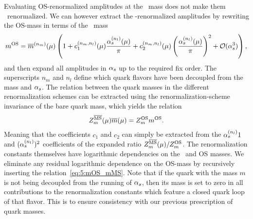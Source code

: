 Evaluating \acs{OS}-renormalized amplitudes at the \MS\ mass does not make them \MS\ renormalized. We can however extract the \MS-renormalized amplitudes by rewriting the \acs{OS}-mass in terms of the \MS\ mass
\begin{equation}
m^{\text{OS}}  = \overline{m}^{(n_m)}(\mu) \left(1 + c_1^{(n_m,n_l)} (\mu) \frac{\alpha_s^{(n_l)}(\mu)}{\pi} + c_2^{(n_m, n_l)}(\mu) \left( \frac{\alpha_s^{(n_l)}(\mu)}{\pi} \right)^2 + \mathcal{O}(\alpha_s^3)\right),
\label{eq:5:mOS_mMS}
\end{equation}
and then expand all amplitudes in $\alpha_s$ up to the required fix order. The superscripts $n_m$ and $n_l$ define which quark flavors have been decoupled from the mass and $\alpha_s$. The relation between the quark masses in the different renormalization schemes can be extracted using the renormalization-scheme invariance of the bare quark mass, which yields the relation
\begin{equation}
Z_m^{\overline{\mathrm{MS}}}(\mu) \overline{m}(\mu) = Z_m^{\text{OS}} m^{\text{OS}}.
\end{equation}
Meaning that the coefficients $c_1$ and $c_2$ can simply be extracted from the $\alpha_s^{(n_l)}1$ and $(\alpha_s^{(n_l)})^2$ coefficients of the expanded ratio $Z_m^{\overline{\mathrm{MS}}}(\mu)/Z_m^{\text{OS}}$. The renormalization constants themselves have logarithmic dependencies on the \MS\ and \acs{OS} masses. We eliminate any residual logarithmic dependence on the \acs{OS}-mass by recursively inserting the relation~\eqref{eq:5:mOS_mMS}. Note that if the quark with the mass $m$ is not being decoupled from the running of $\alpha_s$, then its mass is set to zero in all contributions to the renormalization constants which feature a closed quark loop of that flavor. This is to ensure consistency with our previous prescription of quark masses.

